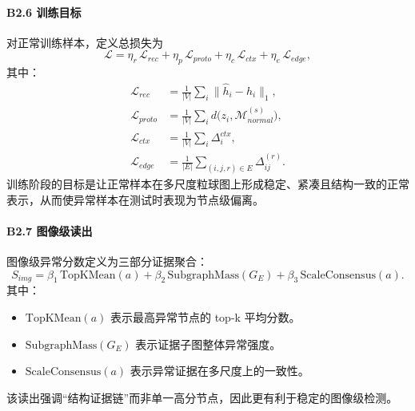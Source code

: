 \documentclass[UTF8,a4paper]{ctexart}
\begin{document}
\paragraph{B2.6 训练目标}
对正常训练样本，定义总损失为
\begin{equation}
  \mathcal{L}=\eta_r\,\mathcal{L}_{rec}
  +\eta_p\,\mathcal{L}_{proto}
  +\eta_c\,\mathcal{L}_{ctx}
  +\eta_e\,\mathcal{L}_{edge},
\end{equation}
其中：
\begin{align}
  \mathcal{L}_{rec}&=\frac{1}{|V|}\sum_i\lVert \hat{h}_i-h_i\rVert_1,\\
  \mathcal{L}_{proto}&=\frac{1}{|V|}\sum_i d\big(z_i,\mathcal{M}_{normal}^{(s)}\big),\\
  \mathcal{L}_{ctx}&=\frac{1}{|V|}\sum_i\Delta_i^{ctx},\\
  \mathcal{L}_{edge}&=\frac{1}{|E|}\sum_{(i,j,r)\in E}\Delta_{ij}^{(r)}.
\end{align}
训练阶段的目标是让正常样本在多尺度粒球图上形成稳定、紧凑且结构一致的正常表示，从而使异常样本在测试时表现为节点级偏离。

\paragraph{B2.7 图像级读出}
图像级异常分数定义为三部分证据聚合：
\begin{equation}
  S_{img}=\beta_1\,\mathrm{TopKMean}(a)
  +\beta_2\,\mathrm{SubgraphMass}(G_E)
  +\beta_3\,\mathrm{ScaleConsensus}(a).
\end{equation}
其中：
\begin{itemize}
  \item $\mathrm{TopKMean}(a)$ 表示最高异常节点的 top-k 平均分数。
  \item $\mathrm{SubgraphMass}(G_E)$ 表示证据子图整体异常强度。
  \item $\mathrm{ScaleConsensus}(a)$ 表示异常证据在多尺度上的一致性。
\end{itemize}
该读出强调“结构证据链”而非单一高分节点，因此更有利于稳定的图像级检测。
\end{document}
